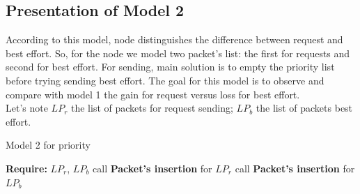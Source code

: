 \documentclass{article}
\begin{document}
\subsection{Presentation of Model 2}
According to this model, node distinguishes the difference between request and best effort. So, for the node we model two packet's list: the first for requests and second for best effort. For sending, main solution is to empty the priority list before trying sending best effort. The goal for this model is to observe and compare with model 1 the gain for request versus loss for best effort.\\
Let's note $LP_{r}$ the list of packets for request sending; $LP_{b}$ the list of packets best effort.

\begin{algorithm}
\caption{Model 2 for priority }
\begin{algorithmic}
\State \textbf{Require:}  $LP_{r}$, $LP_{b}$
\State call \textbf{ Packet's insertion} for $LP_{r}$
\EndWhile
\State call \textbf{ Packet's insertion} for $LP_{b}$
\end{algorithmic}
\end{algorithm}
\newpage
\end{document}
